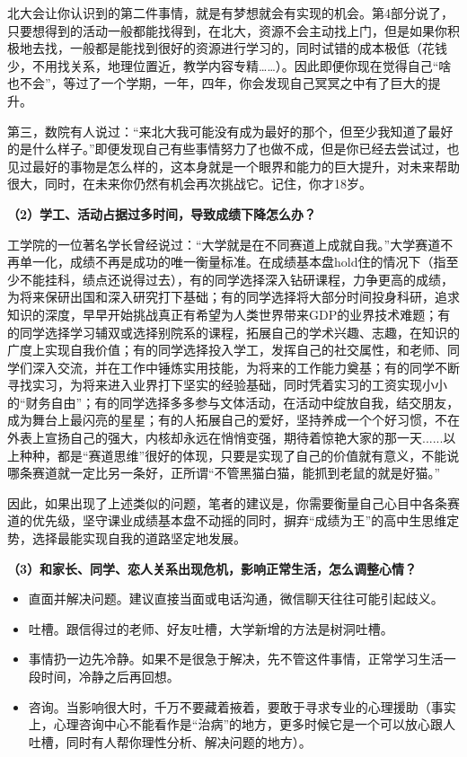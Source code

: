 \documentclass[11pt,oneside]{book}
\begin{document}
北大会让你认识到的第二件事情，就是有梦想就会有实现的机会。第4部分说了，只要想得到的活动一般都能找得到，在北大，资源不会主动找上门，但是如果你积极地去找，一般都是能找到很好的资源进行学习的，同时试错的成本极低（花钱少，不用找关系，地理位置近，教学内容专精……）。因此即便你现在觉得自己“啥也不会”，等过了一个学期，一年，四年，你会发现自己冥冥之中有了巨大的提升。

第三，数院有人说过：“来北大我可能没有成为最好的那个，但至少我知道了最好的是什么样子。”即便发现自己有些事情努力了也做不成，但是你已经去尝试过，也见过最好的事物是怎么样的，这本身就是一个眼界和能力的巨大提升，对未来帮助很大，同时，在未来你仍然有机会再次挑战它。记住，你才18岁。


\textbf{（2）学工、活动占据过多时间，导致成绩下降怎么办？}

工学院的一位著名学长曾经说过：“大学就是在不同赛道上成就自我。”大学赛道不再单一化，成绩不再是成功的唯一衡量标准。在成绩基本盘hold住的情况下（指至少不能挂科，绩点还说得过去），有的同学选择深入钻研课程，力争更高的成绩，为将来保研出国和深入研究打下基础；有的同学选择将大部分时间投身科研，追求知识的深度，早早开始挑战真正有希望为人类世界带来GDP的业界技术难题；有的同学选择学习辅双或选择别院系的课程，拓展自己的学术兴趣、志趣，在知识的广度上实现自我价值；有的同学选择投入学工，发挥自己的社交属性，和老师、同学们深入交流，并在工作中锤炼实用技能，为将来的工作能力奠基；有的同学不断寻找实习，为将来进入业界打下坚实的经验基础，同时凭着实习的工资实现小小的“财务自由”；有的同学选择多多参与文体活动，在活动中绽放自我，结交朋友，成为舞台上最闪亮的星星；有的人拓展自己的爱好，坚持养成一个个好习惯，不在外表上宣扬自己的强大，内核却永远在悄悄变强，期待着惊艳大家的那一天......以上种种，都是“赛道思维”很好的体现，只要是实现了自己的价值就有意义，不能说哪条赛道就一定比另一条好，正所谓“不管黑猫白猫，能抓到老鼠的就是好猫。”

因此，如果出现了上述类似的问题，笔者的建议是，你需要衡量自己心目中各条赛道的优先级，坚守课业成绩基本盘不动摇的同时，摒弃“成绩为王”的高中生思维定势，选择最能实现自我的道路坚定地发展。

\textbf{（3）和家长、同学、恋人关系出现危机，影响正常生活，怎么调整心情？}

\begin{itemize}
    \item 直面并解决问题。建议直接当面或电话沟通，微信聊天往往可能引起歧义。
    \item 吐槽。跟信得过的老师、好友吐槽，大学新增的方法是树洞吐槽。
    \item 事情扔一边先冷静。如果不是很急于解决，先不管这件事情，正常学习生活一段时间，冷静之后再回想。
    \item 咨询。当影响很大时，千万不要藏着掖着，要敢于寻求专业的心理援助（事实上，心理咨询中心不能看作是“治病”的地方，更多时候它是一个可以放心跟人吐槽，同时有人帮你理性分析、解决问题的地方）。
\end{itemize}
\end{document}
